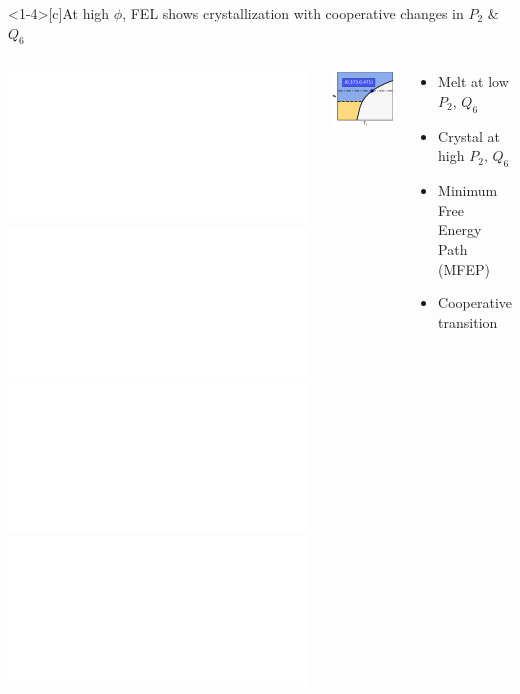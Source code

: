 \documentclass[aspectratio=169]{beamer}
\begin{document}
\begin{frame}
{
  }


\end{frame}


\begin{frame}<1-4>[c]{At high $\phi$, FEL shows crystallization with cooperative changes in $P_{2}$ \& $Q_{6}$}

  \begin{columns}[T]

    \centering
    \includegraphics<1>[]{../figures/fig-pathway_10p25/subfig-pathway_10p25.pdf}\includegraphics<2>[]{../figures/fig-pathway_10p25/fig-pathway_10p25_wConfs.pdf}\includegraphics<3>[]{../figures/fig-pathway_10p25/fig-pathway_10p25_wMFEP.pdf}\includegraphics<4>[]{../figures/fig-pathway_10p25/fig-pathway_10p25_wArrow.pdf}

     \centering
     \includegraphics[]{../figures/old_fig-pathway_10p25/fig-phase_diag_mark_cryst.pdf}
     \vspace{-0.5\baselineskip}
     \begin{block}{}
       \begin{itemize}
         \setlength\itemsep{0.5em}
         \item Melt at low $P_{2}$, $Q_{6}$
         \item Crystal at high $P_{2}$, $Q_{6}$
         \item<3-> {\color{yellow}{\rule{1cm}{0.1cm}} } Minimum Free Energy Path (MFEP)
         \item<4>{Cooperative transition}
       \end{itemize}
     \end{block}
     

\end{columns}
\end{frame}
\end{document}
